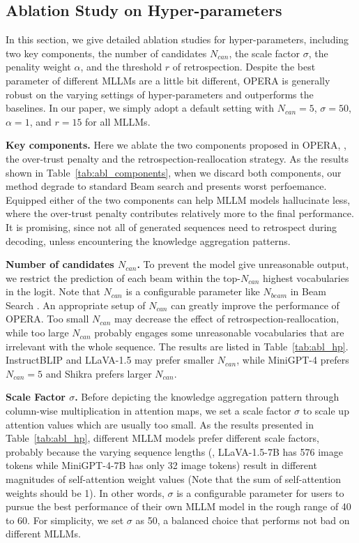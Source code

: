 \documentclass[10pt,twocolumn,letterpaper]{article}
\newcommand{\Tref}[1]{Table~\ref{#1}}
\begin{document}
\subsection{Ablation Study on Hyper-parameters}
\label{sec:supp_2}

In this section, we give detailed ablation studies for hyper-parameters, including two key components, the number of candidates $N_{can}$, the scale factor $\sigma$, the penality weight $\alpha$, and the threshold $r$ of retrospection. 
Despite the best parameter of different MLLMs are a little bit different, OPERA is generally robust on the varying settings of hyper-parameters and outperforms the baselines. 
In our paper, we simply adopt a default setting with $N_{can}=5$, $\sigma=50$, $\alpha=1$, and $r=15$ for all MLLMs.


\noindent\textbf{Key components.} 
Here we ablate the two components proposed in OPERA, \ie, the over-trust penalty and the retrospection-reallocation strategy. 
As the results shown in \Tref{tab:abl_components}, when we discard both components, our method degrade to standard Beam search and presents worst perfoemance. 
Equipped either of the two components can help MLLM models hallucinate less, where the over-trust penalty contributes relatively more to the final performance. 
It is promising, since not all of generated sequences need to retrospect during decoding, unless encountering the knowledge aggregation patterns. 

\noindent\textbf{Number of candidates $N_{can}$.}
To prevent the model give unreasonable output, we restrict the prediction of each beam within the top-$N_{can}$ highest vocabularies in the logit. 
Note that $N_{can}$ is a configurable parameter like $N_{beam}$ in Beam Search \cite{graves2012sequence,sutskever2014sequence,boulanger2013audio}. 
An appropriate setup of $N_{can}$ can greatly improve the performance of OPERA. 
Too small $N_{can}$ may decrease the effect of retrospection-reallocation, while too large $N_{can}$ probably engages some unreasonable vocabularies that are irrelevant with the whole sequence. 
The results are listed in \Tref{tab:abl_hp}. 
InstructBLIP \cite{instructblip} and LLaVA-1.5 \cite{liu2023improvedllava} may prefer smaller $N_{can}$, while MiniGPT-4 \cite{zhu2023minigpt} prefers $N_{can}=5$ and Shikra \cite{chen2023shikra} prefers larger $N_{can}$.


\noindent\textbf{Scale Factor $\sigma$.} 
Before depicting the knowledge aggregation pattern through column-wise multiplication in attention maps, we set a scale factor $\sigma$ to scale up attention values which are usually too small. 
As the results presented in \Tref{tab:abl_hp}, different MLLM models prefer different scale factors, probably because the varying sequence lengths (\eg, LLaVA-1.5-7B has 576 image tokens while MiniGPT-4-7B has only 32 image tokens) result in different magnitudes of self-attention weight values (Note that the sum of self-attention weights should be 1). 
In other words, $\sigma$ is a configurable parameter for users to pursue the best performance of their own MLLM model in the rough range of 40 to 60. 
For simplicity, we set $\sigma$ as 50, a balanced choice that performs not bad on different MLLMs.
\end{document}
